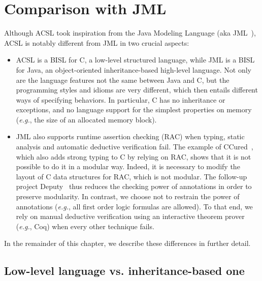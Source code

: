\section{Comparison with JML}
\label{sec:comp-jml}


Although ACSL took inspiration from the Java Modeling Language (aka
JML~\cite{jmlhomepage}), ACSL is notably different from JML in
two crucial aspects:

\begin{itemize}
\item ACSL is a BISL for C, a low-level structured language, while JML
  is a BISL for Java, an object-oriented inheritance-based high-level
  language. Not only are the language features not the same between Java and C, but the
  programming styles and idioms are very different, which then entails
  different ways of specifying behaviors. In particular, C has no
  inheritance or exceptions, and no language support for the simplest
  properties on memory (\emph{e.g.}, the size of an allocated memory block).
\item JML also supports runtime assertion checking (RAC) when typing,
  static analysis and automatic deductive verification fail. The
  example of CCured~\cite{necula02ccured,condit03ccured}, which also adds
  strong typing to C by relying on RAC, shows that it is not possible
  to do it in a modular way. Indeed, it is necessary to modify the
  layout of C data structures for RAC, which is not modular. The
  follow-up project Deputy~\cite{condit07deputy} thus reduces the
  checking power of annotations in order to preserve modularity.  In contrast, we choose not to restrain the power of annotations
  (\emph{e.g.}, all first order logic formulas are allowed). To that end, we
  rely on manual deductive verification using an interactive theorem
  prover (\emph{e.g.}, Coq) when every other technique fails.
\end{itemize}

\noindent
In the remainder of this chapter, we describe these differences in
further detail.

\subsection{Low-level language vs. inheritance-based one}

